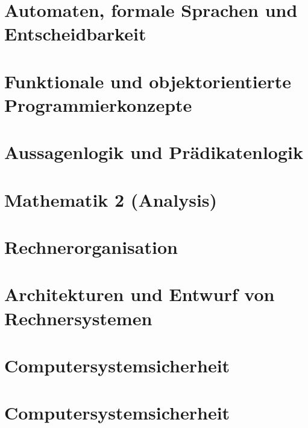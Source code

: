 \newcommand{\lstbasepath}{unset}
\part{Automaten, formale Sprachen und Entscheidbarkeit}
\graphicspath{{./mandatory/fs1/afe/}}
\renewcommand{\lstbasepath}{./mandatory/fs1/afe}

\part{Funktionale und objektorientierte Programmierkonzepte}
\graphicspath{{./mandatory/fs1/fop/}}
\renewcommand{\lstbasepath}{./mandatory/fs1/fop}

\part{Aussagenlogik und Prädikatenlogik}
\graphicspath{{./mandatory/fs2/apl/}}
\renewcommand{\lstbasepath}{./mandatory/fs2/apl}

\part{Mathematik 2 (Analysis)}
\graphicspath{{./mandatory/fs2/mathe2/}}
\renewcommand{\lstbasepath}{./mandatory/fs2/mathe2}

\part{Rechnerorganisation}
\graphicspath{{./mandatory/fs2/ro/}}
\renewcommand{\lstbasepath}{./mandatory/fs2/ro}

\part{Architekturen und Entwurf von Rechnersystemen}
\graphicspath{{./mandatory/fs3/aer/}}
\renewcommand{\lstbasepath}{./mandatory/fs3/aer}

\part{Computersystemsicherheit}
\graphicspath{{./mandatory/fs3/css-fischlin/}}
\renewcommand{\lstbasepath}{./mandatory/fs3/css-fischlin}

\part{Computersystemsicherheit}
\graphicspath{{./mandatory/fs3/css-waidner/}}
\renewcommand{\lstbasepath}{./mandatory/fs3/css-waidner}


